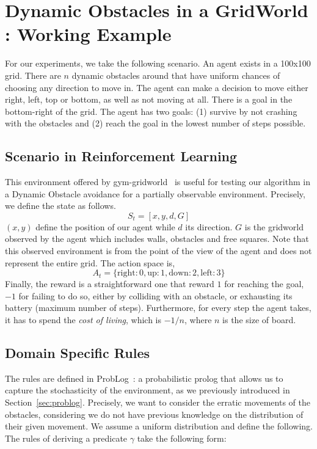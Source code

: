 \section{Dynamic Obstacles in a GridWorld : Working Example} 
\label{gridworlddyn}

For our experiments, we take the following scenario. An agent exists in a 100x100 grid. 
There are $n$ dynamic obstacles around that have uniform chances of choosing any direction to move in. 
The agent can make a decision to move either right, left, top or bottom, as well as not moving at all. 
There is a goal in the bottom-right of the grid. The agent has two goals: (1) survive by not crashing with the obstacles and (2) reach the goal in the lowest number of steps possible. 

\subsection{Scenario in Reinforcement Learning}

This environment offered by gym-gridworld~\cite{gym_minigrid} is useful for testing our algorithm in a Dynamic Obstacle avoidance for a partially observable 
environment. Precisely, we define the state as follows. 
\begin{equation*}
  S_t = [x, y, d, G]
\end{equation*}
$(x,y)$ define the position of our agent while $d$ its direction. $G$
is the gridworld observed by the agent which includes walls, obstacles
and free squares. Note that this observed environment is from the point of the view 
of the agent and does not represent the entire grid. 
The action space is, 
\begin{equation*}
  A_t = \{ \text{right}: 0, \text{up}: 1, \text{down}: 2, \text{left}: 3 \}
\end{equation*}
Finally, the reward is a straightforward one that reward $1$ for reaching the goal, $-1$ for failing to do so, either by colliding with an obstacle, 
or exhausting its battery (maximum number of steps). Furthermore, for
every step the agent takes, it has to spend the \emph{cost of living},
which is $-1/n$, where $n$ is the size of board.


\subsection{Domain Specific Rules}

The rules are defined in ProbLog~\cite{problog}: a probabilistic prolog that allows us to capture 
the stochasticity of the environment, as we previously introduced in
Section~\ref{sec:problog}. Precisely, we want to consider the erratic movements of the obstacles, considering 
we do not have previous knowledge on the distribution of their given movement. We assume a uniform distribution and define the following. 
The rules of \dio{} deriving a predicate $\gamma$ take the following form: 

